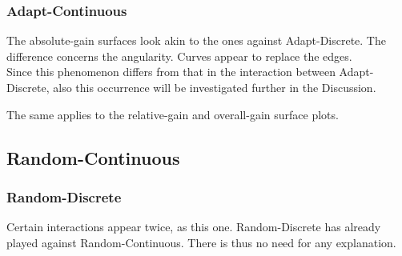 \documentclass[11pt]{article}
\begin{document}
\subsubsection*{Adapt-Continuous}
		The absolute-gain surfaces look akin to the ones against Adapt-Discrete.
		The difference concerns the angularity.
		Curves appear to replace the edges.\\
		Since this phenomenon differs from that in the interaction between Adapt-Discrete, also this occurrence will be investigated further in the Discussion.
		

		The same applies to the relative-gain and overall-gain surface plots.\\

	
\subsection{Random-Continuous}

\subsubsection*{Random-Discrete}
		Certain interactions appear twice, as this one.
		Random-Discrete has already played against Random-Continuous.
		There is thus no need for any explanation.\\
	
\end{document}
